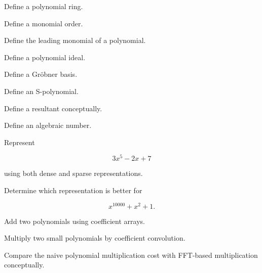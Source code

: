 \begin{exercise}[1]
Define a polynomial ring.
\end{exercise}

\begin{exercise}[1]
Define a monomial order.
\end{exercise}

\begin{exercise}[1]
Define the leading monomial of a polynomial.
\end{exercise}

\begin{exercise}[1]
Define a polynomial ideal.
\end{exercise}

\begin{exercise}[1]
Define a Gröbner basis.
\end{exercise}

\begin{exercise}[1]
Define an S-polynomial.
\end{exercise}

\begin{exercise}[1]
Define a resultant conceptually.
\end{exercise}

\begin{exercise}[1]
Define an algebraic number.
\end{exercise}

\begin{exercise}[2]
Represent

\[
3x^5-2x+7
\]

using both dense and sparse representations.
\end{exercise}

\begin{exercise}[2]
Determine which representation is better for

\[
x^{10000}+x^2+1.
\]
\end{exercise}

\begin{exercise}[2]
Add two polynomials using coefficient arrays.
\end{exercise}

\begin{exercise}[2]
Multiply two small polynomials by coefficient convolution.
\end{exercise}

\begin{exercise}[3]
Compare the naive polynomial multiplication cost with FFT-based
multiplication conceptually.
\end{exercise}

